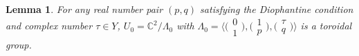 \documentclass[10pt,a4paper]{amsart}
\numberwithin{equation}{section}
\newtheorem{Lemma}[Theorem]{Lemma}
\begin{document}
\begin{Lemma} \label{Lemma2.12}
For any real number pair $(p,q)$ satisfying the Diophantine condition and complex number $\tau \in Y$, $U_0=\mathbb{C}^2/\Lambda_0$ with $\Lambda_0=\bigl\langle\bigl(\begin{smallmatrix}0 \\1\end{smallmatrix}\bigr),\bigl(\begin{smallmatrix}1 \\p\end{smallmatrix}\bigr),\bigl(\begin{smallmatrix}\tau \\q\end{smallmatrix}\bigr)\bigr\rangle$ is a toroidal group.
\end{Lemma}
\end{document}
